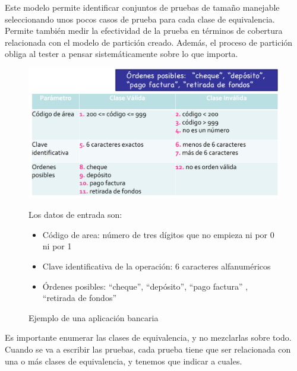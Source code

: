 Este modelo permite identificar conjuntos de pruebas de tamaño manejable seleccionando unos pocos casos de prueba para cada clase de equivalencia.
Permite también medir la efectividad de la prueba en términos de cobertura relacionada con el modelo de partición creado.
Además, el proceso de partición obliga al tester a pensar sistemáticamente sobre lo que importa.


\newpage
\begin{figure}[htbp]
   \centering
   \includegraphics[width=0.65\columnwidth]{images/05/claseBanca.png}
   \caption{Ejemplo de una aplicación bancaria}
   {Los datos de entrada son:\ns
   \begin{itemize}
   	\item Código de area: número de tres dígitos que no empieza ni por 0 ni por 1
	\item Clave identificativa de la operación: 6 caracteres alfanuméricos
	\item Órdenes posibles: ``cheque'', ``depósito'', ``pago factura'' , ``retirada de fondos'' 
   \end{itemize}}
   \label{fig:05/claseBanca}
\end{figure}

Es importante enumerar las clases de equivalencia, y no mezclarlas sobre todo.
Cuando se va a escribir las pruebas, cada prueba tiene que ser relacionada con una o más clases de equivalencia, y tenemos que indicar a cuales.

